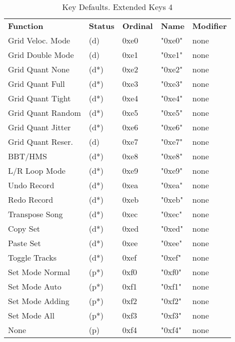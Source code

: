    \begin{table}[htb!]
      \centering
      \caption{Key Defaults. Extended Keys 4}
      \label{table:key_defaults_extended_keys_4}
      \begin{tabular}{l l l l l}
        \textbf{Function} & \textbf{Status} & \textbf{Ordinal} & \textbf{Name} & \textbf{Modifier} \\
        Grid Veloc. Mode   & (d)  &  0xe0   & "0xe0"       & none \\
        Grid Double Mode   & (d)  &  0xe1   & "0xe1"       & none \\
        Grid Quant None    & (d*) &  0xe2   & "0xe2"       & none \\
        Grid Quant Full    & (d*) &  0xe3   & "0xe3"       & none \\
        Grid Quant Tight   & (d*) &  0xe4   & "0xe4"       & none \\
        Grid Quant Random  & (d*) &  0xe5   & "0xe5"       & none \\
        Grid Quant Jitter  & (d*) &  0xe6   & "0xe6"       & none \\
        Grid Quant Reser.  & (d)  &  0xe7   & "0xe7"       & none \\
        BBT/HMS            & (d*) &  0xe8   & "0xe8"       & none \\
        L/R Loop Mode      & (d*) &  0xe9   & "0xe9"       & none \\
        Undo Record        & (d*) &  0xea   & "0xea"       & none \\
        Redo Record        & (d*) &  0xeb   & "0xeb"       & none \\
        Transpose Song     & (d*) &  0xec   & "0xec"       & none \\
        Copy Set           & (d*) &  0xed   & "0xed"       & none \\
        Paste Set          & (d*) &  0xee   & "0xee"       & none \\
        Toggle Tracks      & (d*) &  0xef   & "0xef"       & none \\
        Set Mode Normal    & (p*) &  0xf0   & "0xf0"       & none \\
        Set Mode Auto      & (p*) &  0xf1   & "0xf1"       & none \\
        Set Mode Adding    & (p*) &  0xf2   & "0xf2"       & none \\
        Set Mode All       & (p*) &  0xf3   & "0xf3"       & none \\
        None               & (p)  &  0xf4   & "0xf4"       & none \\

\end{tabular}
\end{table}
